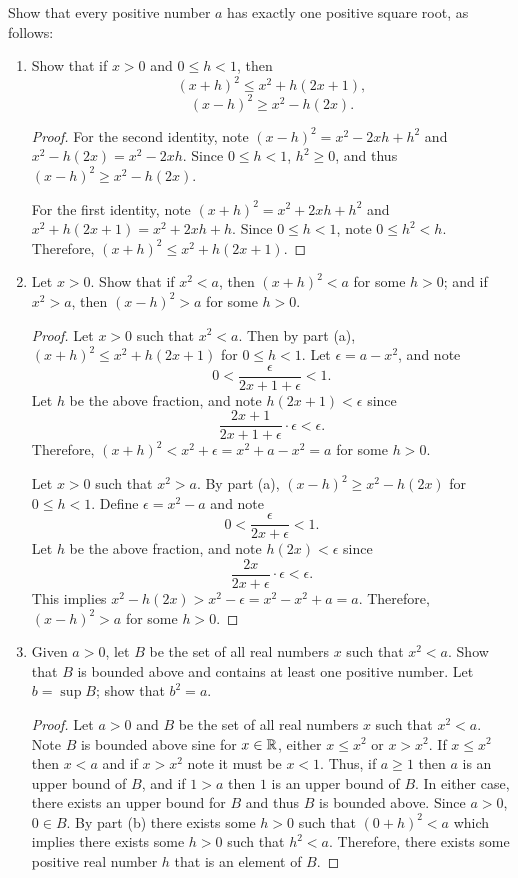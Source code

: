 \documentclass[12pt]{article}
\begin{document}
	 Show that every positive number $a$ has exactly one positive square root, as follows:
	\begin{enumerate}[label=(\alph*)]
		\item Show that if $x > 0$ and $0 \leq h < 1$, then
		$$
		(x + h)^2 \leq x^2 + h(2x + 1),
		$$
		$$
		(x - h)^2 \geq x^2 - h(2x).
		$$
		\begin{proof}
			For the second identity, note $(x - h)^2 = x^2 - 2xh + h^2$ and $x^2 - h(2x) = x^2 - 2xh$.
			Since $0 \leq h < 1$, $h^2 \geq 0$, and thus $(x - h)^2 \geq x^2 - h(2x)$.
			
			For the first identity, note $(x + h)^2 = x^2 + 2xh + h^2$ and $x^2 + h(2x + 1) = x^2 + 2xh + h$.
			Since $0 \leq h < 1$, note $0 \leq h^2 < h$. Therefore, 
			$(x + h)^2 \leq x^2 + h(2x + 1)$.
		\end{proof}
		\item Let $x > 0$. Show that if $x^2 < a$, then $(x + h)^2 < a$ for some $h > 0$; and if
		$x^2 > a$, then $(x - h)^2 > a$ for some $h > 0$.
		\begin{proof}
			Let $x > 0$ such that $x^2 < a$. Then by part (a), $(x + h)^2 \leq x^2 + h(2x + 1)$ for 
			$0 \leq h < 1$. Let $\epsilon = a - x^2$, and note
			$$
			0 < \frac{\epsilon}{2x + 1 + \epsilon} < 1.
			$$
			Let $h$ be the above fraction, and note $h(2x + 1) < \epsilon$ since 
			$$
			\frac{2x + 1}{2x + 1 + \epsilon} \cdot \epsilon < \epsilon.
			$$
			Therefore, $(x + h)^2 < x^2 + \epsilon = x^2 + a - x^2 = a$ for some $h > 0$.
			
			Let $x > 0$ such that $x^2 > a$. By part (a), $(x - h)^2 \geq x^2 - h(2x)$ for $0 \leq h < 1$. Define 
			$\epsilon = x^2 - a$ and note 
			$$
			0 < \frac{\epsilon}{2x + \epsilon} < 1.
			$$
			Let $h$ be the above fraction, and note $h(2x) < \epsilon$ since
			$$
			\frac{2x}{2x + \epsilon} \cdot \epsilon < \epsilon.
			$$
			This implies $x^2 - h(2x) > x^2 - \epsilon = x^2 - x^2 + a = a$. Therefore,
			$(x - h)^2 > a$ for some $h > 0$.
		\end{proof}
		\item Given $a > 0$, let $B$ be the set of all real numbers $x$ such that $x^2 < a$. Show 
		that $B$ is bounded above and contains at least one positive number. Let $b = \sup B$; show
		that $b^2 = a$.
		\begin{proof}
			Let $a > 0$ and $B$ be the set of all real numbers $x$ such that $x^2 < a$. Note 
			$B$ is bounded above sine for $x \in \mathbb{R}$, either $x \leq x^2$ or $x > x^2$. If $x \leq x^2$ then
			$x < a$ and if $x > x^2$ note it must be $x < 1$. Thus, if $a \geq 1$ then $a$ is an upper bound of 
			$B$, and if $1 > a$ then $1$ is an upper bound of $B$. In either case, there exists an upper bound
			for $B$ and thus $B$ is bounded above. Since $a > 0$, $0 \in B$. By part (b) there exists 
			some $h > 0$ such that $(0 + h)^2 < a$ which implies there exists some $h > 0$ such that 
			$h^2 < a$. Therefore, there exists some positive real number $h$ that is an element of $B$.
			

\end{proof}
\end{enumerate}
\end{document}
